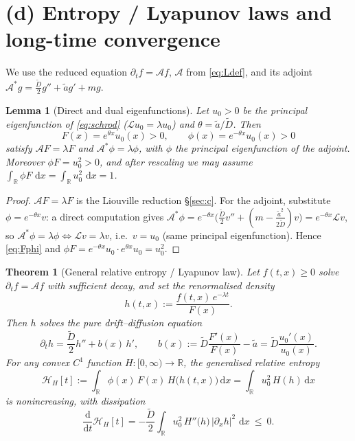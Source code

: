 \documentclass{amsart}
\newtheorem{theorem}{Theorem}
\newtheorem{lemma}{Lemma}
\theoremstyle{definition}
\newcommand{\R}{\mathbb{R}}
\newcommand{\dd}{\,\mathrm{d}}
\begin{document}
\section{(d) Entropy / Lyapunov laws and long-time convergence}

We use the reduced equation $\partial_t f=\mathcal A f$, $\mathcal A$ from \eqref{eq:Ldef}, and
its adjoint $\mathcal A^*g=\frac{\widetilde D}{2}g''+\widetilde a g'+mg$.

\begin{lemma}[Direct and dual eigenfunctions]\label{lem:dual}
Let $u_0>0$ be the principal eigenfunction of \eqref{eq:schrod}
($\mathcal L u_0=\lambda u_0$) and $\theta=\widetilde a/\widetilde D$. Then
\begin{equation}\label{eq:Fphi}
F(x)=e^{\theta x}u_0(x)>0,\qquad \phi(x)=e^{-\theta x}u_0(x)>0
\end{equation}
satisfy $\mathcal A F=\lambda F$ and $\mathcal A^*\phi=\lambda\phi$, with $\phi$ the principal
eigenfunction of the adjoint. Moreover $\phi F=u_0^2>0$, and after rescaling we may assume
$\int_\R \phi F\,\dd x=\int_\R u_0^2\,\dd x=1$.
\end{lemma}

\begin{proof}
$\mathcal A F=\lambda F$ is the Liouville reduction \S\ref{sec:c}. For the adjoint, substitute
$\phi=e^{-\theta x}v$: a direct computation gives
$\mathcal A^*\phi=e^{-\theta x}\bigl(\frac{\widetilde D}{2}v''+(m-\frac{\widetilde a^2}{2\widetilde D})v\bigr)
=e^{-\theta x}\mathcal L v$, so $\mathcal A^*\phi=\lambda\phi\iff\mathcal L v=\lambda v$,
i.e.\ $v=u_0$ (same principal eigenfunction). Hence \eqref{eq:Fphi} and
$\phi F=e^{-\theta x}u_0\cdot e^{\theta x}u_0=u_0^2$.
\end{proof}

\begin{theorem}[General relative entropy / Lyapunov law]\label{thm:GRE}
Let $f(t,x)\ge0$ solve $\partial_t f=\mathcal A f$ with sufficient decay, and set the
\emph{renormalised density}
\begin{equation}\label{eq:renorm}
h(t,x):=\frac{f(t,x)\,e^{-\lambda t}}{F(x)} .
\end{equation}
Then $h$ solves the pure drift--diffusion equation
\begin{equation}\label{eq:hdrift}
\partial_t h=\frac{\widetilde D}{2}h'' + b(x)\,h',\qquad
b(x):=\widetilde D\frac{F'(x)}{F(x)}-\widetilde a=\widetilde D\frac{u_0'(x)}{u_0(x)} .
\end{equation}
For any convex $C^1$ function $H:[0,\infty)\to\R$, the \emph{generalised relative entropy}
\begin{equation}\label{eq:ent}
\mathcal H_H[t]:=\int_\R \phi(x)\,F(x)\,H\!\bigl(h(t,x)\bigr)\dd x
=\int_\R u_0^2\,H(h)\dd x
\end{equation}
is nonincreasing, with dissipation
\begin{equation}\label{eq:diss}
\frac{\mathrm d}{\mathrm dt}\mathcal H_H[t]
=-\frac{\widetilde D}{2}\int_\R u_0^2\,H''\!\bigl(h\bigr)\,|\partial_x h|^2\,\dd x\ \le\ 0 .
\end{equation}
\end{theorem}
\end{document}
